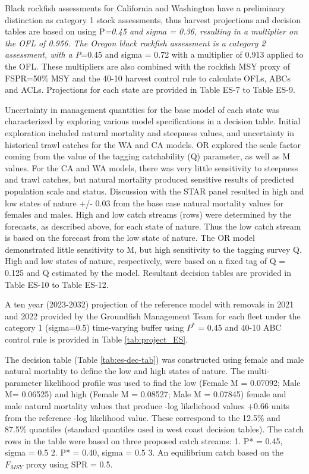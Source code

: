 \documentclass[11pt,
  english,
  letterpaper,
]{article}
\begin{document}
Black rockfish assessments for California and Washington have a preliminary distinction as category 1 stock assessments, thus harvest projections and decision tables are based on using P\emph{=0.45 and sigma = 0.36, resulting in a multiplier on the OFL of 0.956. The Oregon black rockfish assessment is a category 2 assessment, with a P}=0.45 and sigma = 0.72 with a multiplier of 0.913 applied to the OFL. These multipliers are also combined with the rockfish MSY proxy of FSPR=50\% MSY and the 40-10 harvest control rule to calculate OFLs, ABCs and ACLs. Projections for each state are provided in Table ES-7 to Table ES-9.

Uncertainty in management quantities for the base model of each state was characterized by exploring various model specifications in a decision table. Initial exploration included natural mortality and steepness values, and uncertainty in historical trawl catches for the WA and CA models. OR explored the scale factor coming from the value of the tagging catchability (Q) parameter, as well as M values. For the CA and WA models, there was very little sensitivity to steepness and trawl catches, but natural mortality produced sensitive results of predicted population scale and status. Discussion with the STAR panel resulted in high and low states of nature +/- 0.03 from the base case natural mortality values for females and males. High and low catch streams (rows) were determined by the forecasts, as described above, for each state of nature. Thus the low catch stream is based on the forecast from the low state of nature. The OR model demonstrated little sensitivity to M, but high sensitivity to the tagging survey Q. High and low states of nature, respectively, were based on a fixed tag of Q = 0.125 and Q estimated by the model. Resultant decision tables are provided in Table ES-10 to Table ES-12.

A ten year (2023-2032) projection of the reference model with removals in 2021 and 2022 provided by the Groundfish Management Team for each fleet under the category 1 (sigma=0.5) time-varying buffer using \(P^*\) = 0.45 and 40-10 ABC control rule is provided in Table \ref{tab:project_ES}.



The decision table (Table \ref{tab:es-dec-tab}) was constructed using female and male natural mortality to define the low and high states of nature. The multi-parameter likelihood profile was used to find the low (Female M = 0.07092; Male M= 0.06525) and high (Female M = 0.08527; Male M = 0.07845) female and male natural mortality values that produce -log likeliehood values +0.66 units from the reference -log likelihood value. These correspond to the 12.5\% and 87.5\% quantiles (standard quantiles used in west coast decision tables). The catch rows in the table were based on three proposed catch streams: 1. P* = 0.45, sigma = 0.5 2. P* = 0.40, sigma = 0.5 3. An equilibrium catch based on the \(F_{MSY}\) proxy using SPR = 0.5.
\end{document}
